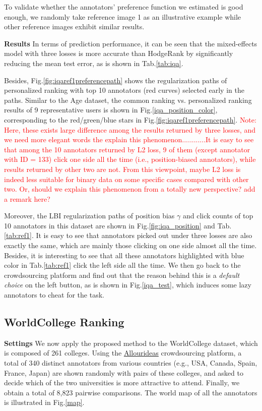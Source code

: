 \documentclass[10pt,journal,cspaper,compsoc]{IEEEtran}
\begin{document}
{To validate whether the annotators' preference function we estimated is good enough, we randomly take
reference image 1 as an illustrative example while other reference
images exhibit similar results.

\textbf{Results} In terms of prediction performance, it can be seen that the mixed-effects model with three losses is more accurate than HodgeRank by significantly reducing the mean test error, as is shown in Tab.\ref{tab:iqa}.

Besides, Fig.\ref{fig:iqaref1preferencepath} shows the regularization paths of personalized ranking with top 10 annotators (red curves) selected early in the paths.
Similar to the Age dataset, the common ranking vs. personalized ranking results of 9 representative users is shown in Fig.\ref{iqa_position_color}, corresponding to the red/green/blue stars in Fig.\ref{fig:iqaref1preferencepath}. \textcolor{red}{Note: Here, these exists large difference among the results returned by three losses, and we need more elegant words the explain this phenomenon............It is easy to see
that among the 10 annotators returned by L2 loss, 9 of them (except annotator
with ID = 133) click one side all the time (i.e., position-biased
annotators), while results returned by other two are not. From this viewpoint, maybe L2 loss is indeed less suitable for binary data on some specific cases compared with other two. Or, should we explain this phenomenon from a totally new perspective? add a remark here? }


Moreover, the LBI regularization paths of position bias $\gamma$ and click counts of top 10 annotators in this dataset are shown in Fig.\ref{fig:iqa_position} and Tab.\ref{tab:ref1}. It is easy to see that annotators picked out under three losses are also exactly the same, which are mainly those clicking on
one side almost all the time. Besides, it is interesting to see
that all these annotators highlighted with blue color in
Tab.\ref{tab:ref1} click the left side all the time. We then go back to
the crowdsourcing platform and find out that the reason behind
this is a \emph{default choice} on the left button, as is shown in Fig.\ref{iqa_test}, which induces
some lazy annotators to cheat for the task.



\subsection{WorldCollege Ranking}

\textbf{Settings} We now apply the proposed method to the WorldCollege dataset, which is composed of 261 colleges. Using the \href{http://www.allourideas.org/}{Allourideas} crowdsourcing platform, a total of 340 distinct annotators from various countries (e.g., USA, Canada, Spain, France, Japan)
are shown randomly with pairs of these colleges, and asked to decide which of the
two universities is more attractive to attend. Finally, we obtain a
total of 8,823 pairwise comparisons. The world map of all the annotators
is illustrated in Fig.\ref{map}.

}
\end{document}
